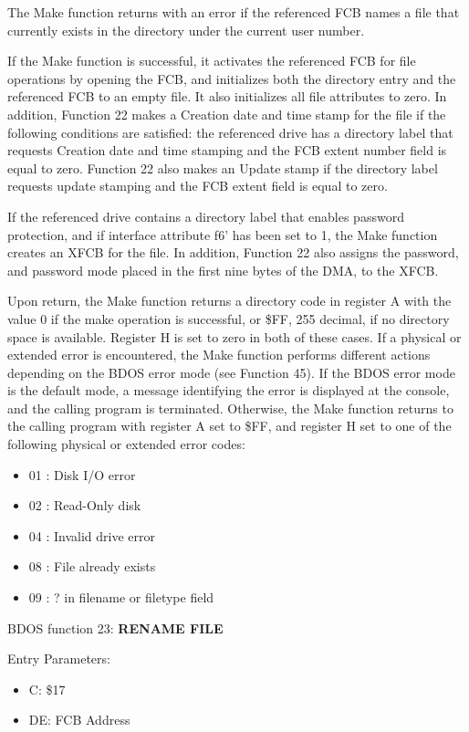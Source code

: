 The Make function returns with an error if the referenced FCB names a
file that currently exists in the directory under the current user
number.

If the Make function is successful, it activates the referenced FCB
for file operations by opening the FCB, and initializes both the
directory entry and the referenced FCB to an empty file. It also
initializes all file attributes to zero. In addition, Function 22
makes a Creation date and time stamp for the file if the following
conditions are satisfied: the referenced drive has a directory label
that requests Creation date and time stamping and the FCB extent
number field is equal to zero. Function 22 also makes an Update stamp
if the directory label requests update stamping and the FCB extent
field is equal to zero.

If the referenced drive contains a directory label that enables
password protection, and if interface attribute f6' has been set to 1,
the Make function creates an XFCB for the file. In addition, Function
22 also assigns the password, and password mode placed in the first
nine bytes of the DMA, to the XFCB.

Upon return, the Make function returns a directory code in register A
with the value 0 if the make operation is successful, or \$FF, 255
decimal, if no directory space is available. Register H is set to zero
in both of these cases. If a physical or extended error is
encountered, the Make function performs different actions depending on
the BDOS error mode (see Function 45). If the BDOS error mode is the
default mode, a message identifying the error is displayed at the
console, and the calling program is terminated. Otherwise, the Make
function returns to the calling program with register A set to \$FF,
and register H set to one of the following physical or extended error
codes:

\begin{itemize}
\item 01 : Disk I/O error
\item 02 : Read-Only disk
\item 04 : Invalid drive error
\item 08 : File already exists
\item 09 : ? in filename or filetype field
\end{itemize}

BDOS function 23: \textbf{RENAME FILE}

Entry Parameters:
\begin{itemize}
\item[] C: \$17
\item[] DE: FCB Address
\end{itemize}

